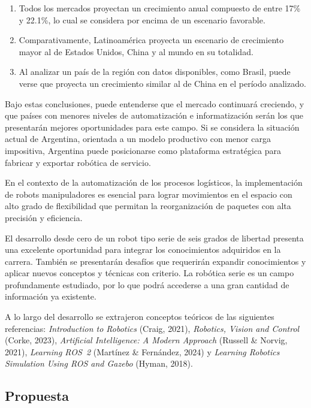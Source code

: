 \documentclass{article}
\begin{document}
\begin{enumerate}
    \item Todos los mercados proyectan un crecimiento anual compuesto de entre 17\% y 22.1\%, lo cual se considera por encima de un escenario favorable.
    \item Comparativamente, Latinoamérica proyecta un escenario de crecimiento mayor al de Estados Unidos, China y al mundo en su totalidad.
    \item Al analizar un país de la región con datos disponibles, como Brasil, puede verse que proyecta un crecimiento similar al de China en el período analizado.
\end{enumerate}

Bajo estas conclusiones, puede entenderse que el mercado continuará creciendo, y que países con menores niveles de automatización e informatización serán los que presentarán mejores oportunidades para este campo. Si se considera la situación actual de Argentina, orientada a un modelo productivo con menor carga impositiva, Argentina puede posicionarse como plataforma estratégica para fabricar y exportar robótica de servicio.

En el contexto de la automatización de los procesos logísticos, la implementación de robots manipuladores es esencial para lograr movimientos en el espacio con alto grado de flexibilidad que permitan la reorganización de paquetes con alta precisión y eficiencia.

El desarrollo desde cero de un robot tipo serie de seis grados de libertad presenta una excelente oportunidad para integrar los conocimientos adquiridos en la carrera. También se presentarán desafíos que requerirán expandir conocimientos y aplicar nuevos conceptos y técnicas con criterio. La robótica serie es un campo profundamente estudiado, por lo que podrá accederse a una gran cantidad de información ya existente.

A lo largo del desarrollo se extrajeron conceptos teóricos de las siguientes referencias: \textit{Introduction to Robotics} (Craig, 2021), \textit{Robotics, Vision and Control} (Corke, 2023), \textit{Artificial Intelligence: A Modern Approach} (Russell \& Norvig, 2021), \textit{Learning ROS~2} (Martínez \& Fernández, 2024) y \textit{Learning Robotics Simulation Using ROS and Gazebo} (Hyman, 2018).

\subsection{Propuesta}
\label{sec:propuesta}
\end{document}
